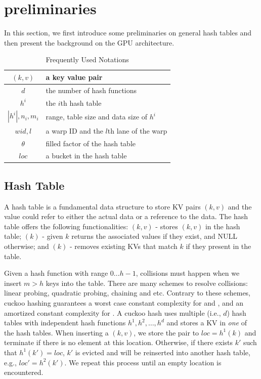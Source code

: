 \section{preliminaries}\label{sec:pre}
In this section, we first introduce some preliminaries on general hash tables and then present the background on the GPU architecture. 

\begin{table}
	\centering
	\caption{Frequently Used Notations}
	\label{tbl:stat:datasets}
	\begin{tabular}{|c|l|}
		\hline
		$(k,v)$ & a key value pair \\ \hline
		$d$		& the number of hash functions \\ \hline
		$h^i$	& the $i$th hash table \\ \hline
		$|h^i|,n_i,m_i$	& range, table size and data size of $h^i$ \\ \hline
		$wid,l$	& a warp ID and the $l$th lane of the warp \\ \hline
		$\theta$& filled factor of the hash table \\ \hline
		$loc$	& a bucket in the hash table \\ \hline
	\end{tabular}
\end{table}

\subsection{Hash Table}
A hash table is a fundamental data structure to store KV pairs $(k,v)$ and the value could refer to either the actual data or a reference to the data.
The hash table offers the following functionalities: $(k,v)$ - stores $(k,v)$ in the hash table; $(k)$ - given $k$ returns the associated values if they exist, and NULL otherwise; and $(k)$ - removes existing KVs that match $k$ if they present in the table.

Given a hash function with range $0 \ldots h-1$, collisions must happen when we insert $m>h$ keys into the table. There are many schemes to resolve collisions: linear probing, quadratic probing, chaining and etc. Contrary to these schemes, cuckoo hashing \cite{pagh2004cuckoo} guarantees a worst case constant complexity for  and ,  and an amortized constant complexity for . A cuckoo hash uses multiple (i.e., $d$) hash tables with independent hash functions $h^1,h^2,\ldots,h^d$ and stores a KV in \emph{one} of the hash tables. When inserting a $(k,v)$, we store the pair to $loc=h^1(k)$ and terminate if there is no element at this location. Otherwise, if there exists $k'$ such that $h^1(k')=loc$, $k'$ is evicted and will be reinserted into another hash table, e.g., $loc'=h^2(k')$.
We repeat this process until an empty location is encountered.

